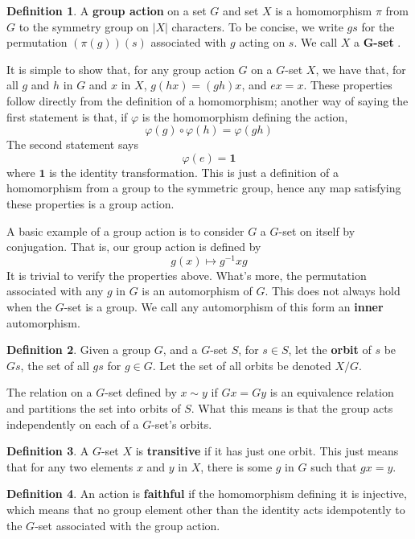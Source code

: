 \documentclass[12pt]{amsbook}
\theoremstyle{plain}
\theoremstyle{definition}
\newtheorem{definition}{Definition}
\begin{document}
\begin{definition}
A {\bf group action}  on a set $G$ and set $X$ is a homomorphism $\pi$ from $G$ to the symmetry group on $|X|$ characters. To be concise, we write $gs$ for the permutation $(\pi(g))(s)$ associated with $g$ acting on $s$. We call $X$ a {\bf G-set} .
\end{definition}

It is simple to show that, for any group action $G$ on a $G$-set $X$, we have that,
for all $g$ and $h$ in $G$ and $x$ in $X$, $g(hx) = (gh)x$, and $ex = x$. These properties follow directly from the definition of a homomorphism; another way of saying the first statement is that, if $\varphi$ is the homomorphism defining the action,%
%
\[\varphi(g) \circ \varphi(h) = \varphi(gh) \]
%
The second statement says
%
\[ \varphi(e) = \mathbf{1} \]
%
where $\mathbf{1}$ is the identity transformation. This is just a definition of a homomorphism from a group to the symmetric group, hence any map satisfying these properties is a group action.

A basic example of a group action is to consider $G$ a $G$-set on itself by conjugation. That is, our group action is defined by
%
\[ g(x) \mapsto g^{-1}xg \]
%
It is trivial to verify the properties above. What's more, the permutation associated with any $g$ in $G$ is an automorphism of $G$. This does not always hold when the $G$-set is a group. We call any automorphism of this form an {\bf inner} automorphism.

\begin{definition}
Given a group $G$, and a $G$-set $S$, for $s \in S$, let the {\bf orbit}  of $s$ be $Gs$, the set of all $gs$ for $g \in G$. Let the set of all orbits be denoted $X/G$.
\end{definition}

The relation on a $G$-set defined by $x \sim y$ if $Gx = Gy$ is an equivalence relation and partitions the set into orbits of $S$. What this means is that the group acts independently on each of a $G$-set's orbits.

\begin{definition}
    A $G$-set $X$ is {\bf transitive}  if it has just one orbit. This just means that for any two elements $x$ and $y$ in $X$, there is some $g$ in $G$ such that $gx = y$.
\end{definition}

\begin{definition}
    An action is {\bf faithful}  if the homomorphism defining it is injective, which means that no group element other than the identity acts idempotently to the $G$-set associated with the group action.
\end{definition}
\end{document}
